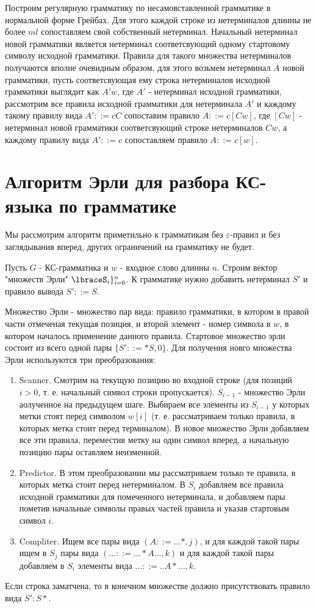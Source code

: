 Построим регулярную грамматику по несамовставленной грамматике в нормальной форме Грейбах. Для этого каждой строке из нетерминалов длинны не более $ml$ сопоставляем
свой собственный нетерминал. Начальный нетерминал новой грамматики является нетерминал соответсвующий одному стартовому символу исходной грамматики. Правила для
такого множества нетерминалов получаются вполне очевидным образом, для этого возьмем нетерминал $A$ новой грамматики, пусть соответсвующая ему строка нетерминалов
исходной грамматики выглядит как $A'w$, где $A'$ - нетерминал исходной грамматики, рассмотрим все правила исходной грамматики для нетерминала $A'$ и каждому такому
 правилу вида $A' ::= cC$ сопоставим правило $A ::= c[Cw]$, где $[Cw]$ - нетерминал новой грамматики соответсвующий строке нетерминалов $Cw$, а каждому правилу
 вида $A' ::= c$ сопоставляем правило $A ::= c[w]$.
 
\section{Алгоритм Эрли для разбора КС-языка по грамматике}

Мы рассмотрим алгоритм приметильно к грамматикам без $\varepsilon$-правил и без заглядывания вперед, других ограничений на грамматику не будет.

Пусть $G$ - КС-грамматика и $w$ - входное слово длинны $n$. Строим вектор "множеств Эрли" $\lbraceS_i\rbrace^{n}_{i=0}$. К грамматике нужно добавить нетерминал $S'$
и правило вывода $S' ::= S$.

Множество Эрли - множество пар вида: правило грамматики, в котором в правой части отмеченая текущая позиция, и второй элемент - номер символа в $w$, в котором началось
применение данного правила. Стартовое множество эрли состоит из всего одной пары $\lbrace S' ::= *S, 0\rbrace$.
Для получения новго множества Эрли используются три преобразования:

\begin{enumerate}
\item Scanner. Смотрим на текущую позицию во входной строке (для позиций $i > 0$, т. е. начальный символ строки пропускается). $S_{i-1}$ - множество Эрли
аолученное на предыдущем шаге. Выбираем все элементы из $S_{i-1}$ у которых метки стоят перед символом $w[i]$ (т. е. рассматриваем только правила, в которых метка стоит
перед терминалом). В новое множество Эрли добавляем все эти правила, переместив метку на один символ вперед, а начальную позицию пары оставляем неизменной.

\item Predictor. В этом преобразовании мы рассматриваем только те правила, в которых метка стоит перед нетерминалом. В $S_i$ добавляем все правила исходной грамматики
для помеченного нетерминала, и добавляем пары пометив начальные символы правых частей правила и указав стартовым символ $i$.

\item Compliter. Ищем все пары вида $(A ::= ...*, j)$, и для каждой такой пары ищем в $S_j$ пары вида $(... ::= ...*A..., k)$ и для каждой такой пары добавляем
в $S_i$ элементы вида $... ::= ..A*..., k$.
\end{enumerate}

Если строка заматчена, то в конечном множестве должно присутствовать правило вида $S' : S*$.